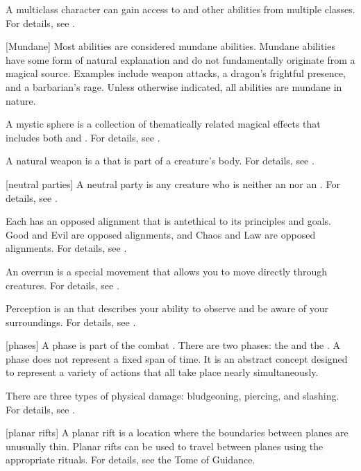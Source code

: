  A multiclass character can gain access to  and other abilities from multiple classes.
For details, see .

[Mundane] Most abilities are considered mundane abilities.
Mundane abilities have some form of natural explanation and do not fundamentally originate from a magical source.
Examples include weapon attacks, a dragon's frightful presence, and a barbarian's rage.
Unless otherwise indicated, all abilities are mundane in nature.

 A mystic sphere is a collection of thematically related magical effects that includes both  and .
For details, see .

 A natural weapon is a  that is part of a creature's body.
For details, see .

[neutral parties] A neutral party is any creature who is neither an  nor an .
For details, see .

 Each  has an opposed alignment that is antethical to its principles and goals.
Good and Evil are opposed alignments, and Chaos and Law are opposed alignments.
For details, see .

 An overrun is a special movement that allows you to move directly through creatures.
For details, see .

 Perception is an  that describes your ability to observe and be aware of your surroundings.
For details, see .

[phases] A phase is part of the combat .
There are two phases: the  and the .
A phase does not represent a fixed span of time.
It is an abstract concept designed to represent a variety of actions that all take place nearly simultaneously.

 There are three types of physical damage: bludgeoning, piercing, and slashing.
For details, see .

[planar rifts] A planar rift is a location where the boundaries between planes are unusually thin.
Planar rifts can be used to travel between planes using the appropriate rituals.
For details, see the Tome of Guidance.

